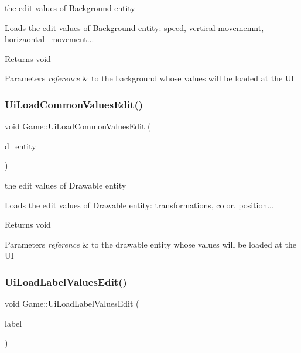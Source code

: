 the edit values of \hyperlink{class_background}{Background} entity

Loads the edit values of \hyperlink{class_background}{Background} entity\+: speed, vertical movememnt, horizaontal\+\_\+movement...

\begin{DoxyReturn}{Returns}
void 
\end{DoxyReturn}

\begin{DoxyParams}{Parameters}
{\em reference} & to the background whose values will be loaded at the UI \\
\hline
\end{DoxyParams}
\mbox{\label{class_game_a0a41188d1bfa82e9e0cdda1c0530a389}} 
\subsubsection{\texorpdfstring{Ui\+Load\+Common\+Values\+Edit()}{UiLoadCommonValuesEdit()}}
{\footnotesize\ttfamily void Game\+::\+Ui\+Load\+Common\+Values\+Edit (\begin{DoxyParamCaption}\item[{\hyperlink{class_drawable_entity}{Drawable\+Entity} \&}]{d\+\_\+entity }\end{DoxyParamCaption})}

the edit values of Drawable entity

Loads the edit values of Drawable entity\+: transformations, color, position...

\begin{DoxyReturn}{Returns}
void 
\end{DoxyReturn}

\begin{DoxyParams}{Parameters}
{\em reference} & to the drawable entity whose values will be loaded at the UI \\
\hline
\end{DoxyParams}
\mbox{\label{class_game_a895e8ae5390fcd21a903623a23ceeaac}} 
\subsubsection{\texorpdfstring{Ui\+Load\+Label\+Values\+Edit()}{UiLoadLabelValuesEdit()}}
{\footnotesize\ttfamily void Game\+::\+Ui\+Load\+Label\+Values\+Edit (\begin{DoxyParamCaption}\item[{\hyperlink{class_label}{Label} \&}]{label }\end{DoxyParamCaption})}

